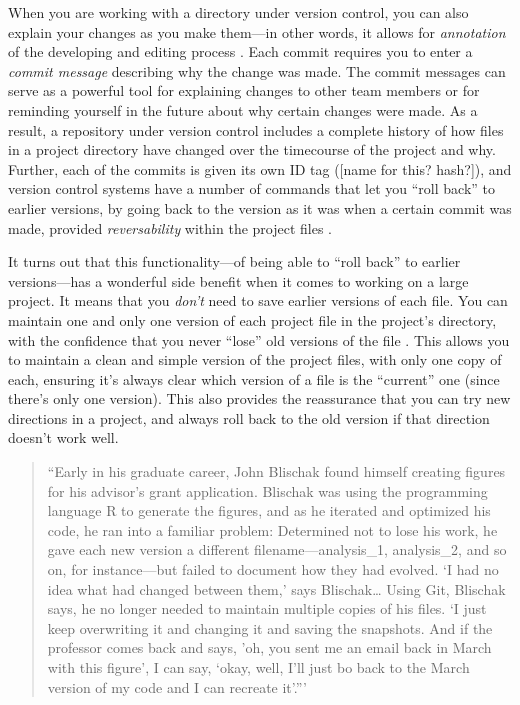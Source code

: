 \documentclass[]{tufte-book}
\begin{document}
When you are working with a directory under version control, you can also
explain your changes as you make them---in other words, it allows for
\emph{annotation} of the developing and editing process \citep{raymondunderstanding}. Each
commit requires you to enter a \emph{commit message} describing why the change was
made. The commit messages can serve as a powerful tool for explaining changes to
other team members or for reminding yourself in the future about why certain
changes were made. As a result, a repository under version control includes a
complete history of how files in a project directory have changed over the
timecourse of the project and why. Further, each of the commits is given its own
ID tag ({[}name for this? hash?{]}), and version control systems have a number of
commands that let you ``roll back'' to earlier versions, by going back to the
version as it was when a certain commit was made, provided \emph{reversability}
within the project files \citep{raymondunderstanding}.

It turns out that this functionality---of being able to ``roll back'' to earlier
versions---has a wonderful side benefit when it comes to working on a large
project. It means that you \emph{don't} need to save earlier versions of each file.
You can maintain one and only one version of each project file in the project's
directory, with the confidence that you never ``lose'' old versions of the file
\citep{perkel2018git, blischak2016quick}. This allows you to maintain a clean and
simple version of the project files, with only one copy of each, ensuring it's
always clear which version of a file is the ``current'' one (since there's only
one version). This also provides the reassurance that you can try new directions
in a project, and always roll back to the old version if that direction doesn't
work well.

\begin{quote}
``Early in his graduate career, John Blischak found himself creating figures
for his advisor's grant application. Blischak was using the programming language
R to generate the figures, and as he iterated and optimized his code, he ran
into a familiar problem: Determined not to lose his work, he gave each new
version a different filename---analysis\_1, analysis\_2, and so on, for
instance---but failed to document how they had evolved. `I had no idea what had
changed between them,' says Blischak\ldots{} Using Git, Blischak says, he no longer
needed to maintain multiple copies of his files. `I just keep overwriting it and
changing it and saving the snapshots. And if the professor comes back and says,
'oh, you sent me an email back in March with this figure', I can say, `okay,
well, I'll just bo back to the March version of my code and I can recreate
it'.''' \citep{perkel2018git}
\end{quote}
\end{document}
